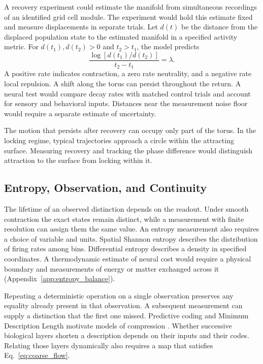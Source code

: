 \documentclass[12pt,a4paper]{article}
\begin{document}
A recovery experiment could estimate the manifold from simultaneous recordings of an identified grid cell module. The experiment would hold this estimate fixed and measure displacements in separate trials. Let $d(t)$ be the distance from the displaced population state to the estimated manifold in a specified activity metric. For $d(t_1),d(t_2)>0$ and $t_2>t_1$, the model predicts
\begin{equation}\label{eq:observed_recovery}
 \frac{\log[d(t_1)/d(t_2)]}{t_2-t_1}=\lambda .
\end{equation}
A positive rate indicates contraction, a zero rate neutrality, and a negative rate local repulsion. A shift along the torus can persist throughout the return. A neural test would compare decay rates with matched control trials and account for sensory and behavioral inputs. Distances near the measurement noise floor would require a separate estimate of uncertainty.

The motion that persists after recovery can occupy only part of the torus. In the locking regime, typical trajectories approach a circle within the attracting surface. Measuring recovery and tracking the phase difference would distinguish attraction to the surface from locking within it.

\subsection{Entropy, Observation, and Continuity}\label{sec:entropy}

The lifetime of an observed distinction depends on the readout. Under smooth contraction the exact states remain distinct, while a measurement with finite resolution can assign them the same value. An entropy measurement also requires a choice of variable and units. Spatial Shannon entropy describes the distribution of firing rates among bins. Differential entropy describes a density in specified coordinates. A thermodynamic estimate of neural cost would require a physical boundary and measurements of energy or matter exchanged across it (Appendix~\ref{app:entropy_balance}).

Repeating a deterministic operation on a single observation preserves any equality already present in that observation. A subsequent measurement can supply a distinction that the first one missed. Predictive coding and Minimum Description Length motivate models of compression \cite{RaoBallard1999,LiVitanyi2008,Prada2025}. Whether successive biological layers shorten a description depends on their inputs and their codes. Relating those layers dynamically also requires a map that satisfies Eq.~\eqref{eq:coarse_flow}.
\end{document}
